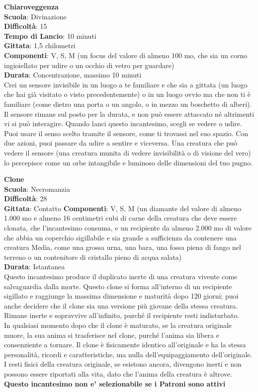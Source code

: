 \begin{multicols}{2}
\medskip\textbf{Chiaroveggenza}\\
\textbf{Scuola}: Divinazione\\
\textbf{Difficoltà}: 15\\
\textbf{Tempo di Lancio}: 10 minuti\\
\textbf{Gittata}: 1,5 chilometri\\
\textbf{Componenti}: V, S, M (un focus del valore di almeno 100 mo, che sia un corno ingioiellato per udire o un occhio di vetro per guardare)\\
\textbf{Durata}: Concentrazione, massimo 10 minuti\\
Crei un sensore invisibile in un luogo a te familiare e che sia a gittata (un luogo che hai già visitato o visto precedentemente) o in un luogo ovvio ma che non ti è familiare (come dietro una porta o un angolo, o in mezzo un boschetto di alberi). Il sensore rimane sul posto per la durata, e non può essere attaccato né altrimenti vi si può interagire. Quando lanci questo incantesimo, scegli se vedere o udire. Puoi usare il senso scelto tramite il sensore, come ti trovassi nel suo spazio. Con due azioni, puoi passare da udire a sentire e viceversa. Una creatura che può vedere il sensore (una creatura munita di vedere invisibilità o di visione del vero) lo percepisce come un orbe intangibile e luminoso delle dimensioni del tuo pugno.

\medskip\textbf{Clone}\\
\textbf{Scuola}: Necromanzia\\
\textbf{Difficoltà}: 28\\
\textbf{Gittata}: Contatto
\textbf{Componenti}: V, S, M (un diamante del valore di almeno 1.000 mo e almeno 16 centimetri cubi di carne della creatura che deve essere clonata, che l'incantesimo consuma, e un recipiente da almeno 2.000 mo di valore che abbia un coperchio sigillabile e sia grande a sufficienza da contenere una creatura Media, come una grossa urna, una bara, una fossa piena di fango nel terreno o un contenitore di cristallo pieno di acqua salata)\\
\textbf{Durata}: Istantanea\\
Questo incantesimo produce il duplicato inerte di una creatura vivente come salvaguardia dalla morte. Questo clone si forma all'interno di un recipiente sigillato e raggiunge la massima dimensione e maturità dopo 120 giorni; puoi anche decidere che il clone sia una versione più giovane della stessa creatura. Rimane inerte e sopravvive all'infinito, purché il recipiente resti indisturbato.\\
In qualsiasi momento dopo che il clone è maturato, se la creatura originale muore, la sua anima si trasferisce nel clone, purché l'anima sia libera e consenziente a tornare. Il clone è fisicamente identico all'originale e ha la stessa personalità, ricordi e caratteristiche, ma nulla dell'equipaggiamento dell'originale. I resti fisici della creatura originale, se esistono ancora, divengono inerti e non possono essere riportati alla vita, dato che l'anima della creatura è altrove. \\
\textbf{Questo incantesimo non e' selezionabile se i Patroni sono attivi}


\end{multicols}
